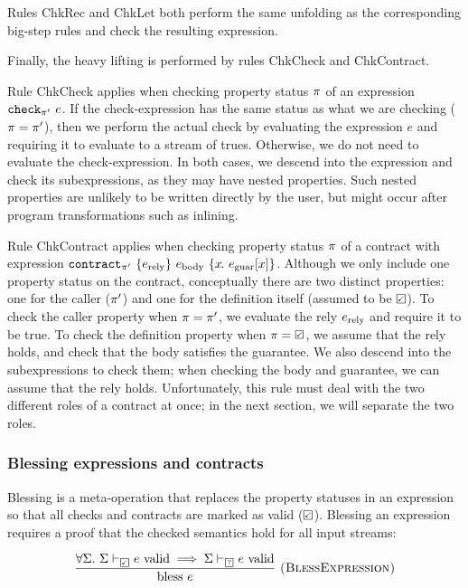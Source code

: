 Rules {\sc ChkRec} and {\sc ChkLet} both perform the same unfolding as the corresponding big-step rules and check the resulting expression.

Finally, the heavy lifting is performed by rules {\sc ChkCheck} and {\sc ChkContract}.

Rule {\sc ChkCheck} applies when checking property status $\pi$ of an expression $\texttt{check}_{\pi'}~e$.
If the check-expression has the same status as what we are checking ($\pi = \pi'$), then we perform the actual check by evaluating the expression $e$ and requiring it to evaluate to a stream of trues.
Otherwise, we do not need to evaluate the check-expression.
In both cases, we descend into the expression and check its subexpressions, as they may have nested properties.
Such nested properties are unlikely to be written directly by the user, but might occur after program transformations such as inlining.

Rule {\sc ChkContract} applies when checking property status $\pi$ of a contract with expression $\texttt{contract}_{\pi'}~\{e_{\text{rely}}\}~e_{\text{body}}~\{x\hspace{-0.1em}.~e_{\text{guar}}[x]\}$.
Although we only include one property status on the contract, conceptually there are two distinct properties: one for the caller ($\pi'$) and one for the definition itself (assumed to be $\PSValid$).
To check the caller property when $\pi = \pi'$, we evaluate the rely $e_{\text{rely}}$ and require it to be true.
To check the definition property when $\PStatus = \PSValid$, we assume that the rely holds, and check that the body satisfies the guarantee.
We also descend into the subexpressions to check them; when checking the body and guarantee, we can assume that the rely holds.
Unfortunately, this rule must deal with the two different roles of a contract at once; in the next section, we will separate the two roles.

\subsubsection{Blessing expressions and contracts}
\label{s:core:blessing}

Blessing is a meta-operation that replaces the property statuses in an expression so that all checks and contracts are marked as valid ($\PSValid$).
Blessing an expression requires a proof that the checked semantics hold for all input streams:

$$
\ruleIN{
  \forall \Sigma.~
  \semcheck{\Sigma}{\PSValid}{e}
  \implies
  \semcheck{\Sigma}{\PSUnknown}{e}
}{\text{bless}~e}{BlessExpression}
$$

